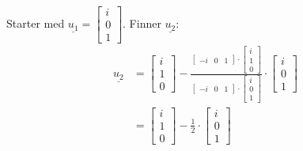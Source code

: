 \documentclass[11pt, a4paper, norsk]{NTNUoving}
\begin{document}
\begin{oppgave}
\begin{punkt}
            Starter med $\underline{u_1} = \begin{bmatrix}
                i \\
                0 \\
                1
            \end{bmatrix}$. Finner $\underline{u_2}$:
            \begin{align*}
                \underline{u_2} &= \begin{bmatrix}
                    i \\
                    1 \\ 
                    0
                \end{bmatrix} - \frac{\begin{bmatrix}
                    -i & 0 & 1
                \end{bmatrix} \cdot \begin{bmatrix}
                    i \\
                    1 \\
                    0
                \end{bmatrix}}{\begin{bmatrix}
                    -i & 0 & 1
                \end{bmatrix} \cdot \begin{bmatrix}
                    i \\
                    0 \\
                    1
                \end{bmatrix}} \cdot \begin{bmatrix}
                    i \\
                    0 \\
                    1
                \end{bmatrix} 
                \\
                                &= \begin{bmatrix}
                                    i \\
                                    1 \\
                                    0
                                \end{bmatrix} - \frac{1}{2} \cdot \begin{bmatrix}
                                    i \\
                                    0 \\
                                    1

\end{bmatrix}
\end{align*}
\end{punkt}
\end{oppgave}
\end{document}
